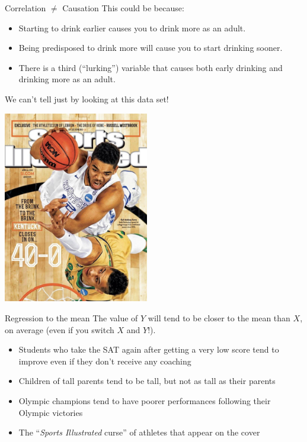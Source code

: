 \documentclass{beamer}\usepackage[]{graphicx}\usepackage[]{color}
\begin{document}
\begin{darkframes}
\begin{frame}{Correlation $\neq$ Causation}
      \bigskip
      This could be because:

      \pause

      \begin{itemize}[<+->]
        \item Starting to drink earlier causes you to drink more as an adult.
        \item Being predisposed to drink more will cause you to start drinking sooner.
        \item There is a third (``lurking'') variable that causes both early drinking and drinking more as an adult.
      \end{itemize}

      \pause
      We can't tell just by looking at this data set!
    \end{frame}

    \begin{frame}
      \begin{center}
        \includegraphics[width=2.5in]{si}
      \end{center}
    \end{frame}

    \begin{frame}{Regression to the mean}
      The value of $Y$ will tend to be closer to the mean than $X$, on average (even if you switch $X$ and $Y$!).
      \begin{itemize}
        \item Students who take the SAT again after getting a very low score tend to improve even if they don't receive any coaching
        \item Children of tall parents tend to be tall, but not as tall as their parents
        \item Olympic champions tend to have poorer performances following their Olympic victories
        \item The ``\emph{Sports Illustrated} curse'' of athletes that appear on the cover
      \end{itemize}
    \end{frame}


\end{darkframes}
\end{document}
